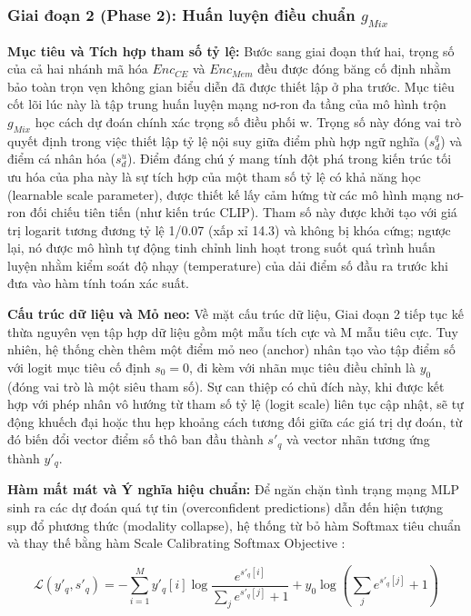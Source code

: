\subsubsection*{Giai đoạn 2 (Phase 2): Huấn luyện điều chuẩn $g_{Mix}$}

\textbf{Mục tiêu và Tích hợp tham số tỷ lệ:}
Bước sang giai đoạn thứ hai, trọng số của cả hai nhánh mã hóa $Enc_{CE}$ và $Enc_{Mem}$ đều được đóng băng cố định nhằm bảo toàn trọn vẹn không gian biểu diễn đã được thiết lập ở pha trước. Mục tiêu cốt lõi lúc này là tập trung huấn luyện mạng nơ-ron đa tầng của mô hình trộn $g_{Mix}$ học cách dự đoán chính xác trọng số điều phối w. Trọng số này đóng vai trò quyết định trong việc thiết lập tỷ lệ nội suy giữa điểm phù hợp ngữ nghĩa ($s_d^q$) và điểm cá nhân hóa ($s_d^u$). Điểm đáng chú ý mang tính đột phá trong kiến trúc tối ưu hóa của pha này là sự tích hợp của một tham số tỷ lệ có khả năng học (learnable scale parameter), được thiết kế lấy cảm hứng từ các mô hình mạng nơ-ron đối chiếu tiên tiến (như kiến trúc CLIP). Tham số này được khởi tạo với giá trị logarit tương đương tỷ lệ 1/0.07 (xấp xỉ 14.3) và không bị khóa cứng; ngược lại, nó được mô hình tự động tinh chỉnh linh hoạt trong suốt quá trình huấn luyện nhằm kiểm soát độ nhạy (temperature) của dải điểm số đầu ra trước khi đưa vào hàm tính toán xác suất.

\textbf{Cấu trúc dữ liệu và Mỏ neo:}
Về mặt cấu trúc dữ liệu, Giai đoạn 2 tiếp tục kế thừa nguyên vẹn tập hợp dữ liệu gồm một mẫu tích cực và M mẫu tiêu cực. Tuy nhiên, hệ thống chèn thêm một điểm mỏ neo (anchor) nhân tạo vào tập điểm số với logit mục tiêu cố định $s_0 = 0$, đi kèm với nhãn mục tiêu điều chỉnh là $y_0$ (đóng vai trò là một siêu tham số). Sự can thiệp có chủ đích này, khi được kết hợp với phép nhân vô hướng từ tham số tỷ lệ (logit scale) liên tục cập nhật, sẽ tự động khuếch đại hoặc thu hẹp khoảng cách tương đối giữa các giá trị dự đoán, từ đó biến đổi vector điểm số thô ban đầu thành $s'_q$ và vector nhãn tương ứng thành $y'_q$.
 
\textbf{Hàm mất mát và Ý nghĩa hiệu chuẩn:}
Để ngăn chặn tình trạng mạng MLP sinh ra các dự đoán quá tự tin (overconfident predictions) dẫn đến hiện tượng sụp đổ phương thức (modality collapse), hệ thống từ bỏ hàm Softmax tiêu chuẩn và thay thế bằng hàm Scale Calibrating Softmax Objective \cite{30}:

$$ \mathcal{L}(y'_q, s'_q) = - \sum_{i=1}^M y'_q[i] \log \frac{e^{s'_q[i]}}{\sum_j e^{s'_q[j]} + 1} + y_0 \log \left( \sum_j e^{s'_q[j]} + 1 \right) $$

